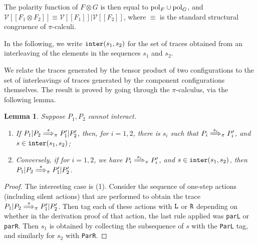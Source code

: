 \documentclass[11pt,a4paper]{amsart}
\theoremstyle{plain}
\theoremstyle{definition}
\theoremstyle{defC}
\theoremstyle{thmC}
\theoremstyle{plain}
\numberwithin{equation}{section}
\def\finish#1{\vskip.2cm\noindent{\em #1}%
  \marginpar{$\longleftarrow$}\vskip.2cm}
\newcommand{\finish}[1]{}
\newcommand{\trace}{s}
\newcommand{\appendCon}[2]{#1 \otimes #2}
\newcommand{\rmm}[1]{{\tt{\lowercase{#1}}}}
\newcommand{\genArr}[2]{\mathrel{\stackrel{{#1}}{\Longrightarrow}_{\rmm{\lowercase{#2}}}}}  %
\newcommand{\ArrPI}[1]{\genArr{#1}{\pi}}   %
\newcommand{\interl}[2]{{\tt inter}( #1, #2)}
\newcommand{\FF}{F}
\newcommand{\GG}{G}
\newcommand{\cbvSymb}{{\mathcal {V}}}
\newcommand{\encoEnvI}[1]{ \cbvSymb[\! [ #1 ] \! ]  } %
\newcommand{\encoConI}{\encoEnvI} %
\newcommand{\gj}[1]{\finish{{\bf GJ:} #1}}
\newcommand{\ds}[1]{\finish{{\bf DS:} #1}}
\newcommand{\gj}[1]{}
\newcommand{\ds}[1]{}
\newcommand{\Label}{{\rm pol}}
\theoremstyle{plain}
\newtheorem{lemma}[thm]{Lemma}
\theoremstyle{definition}
\begin{document}
\noindent
 The polarity function of $\appendCon \FF \GG$ 
 is then equal to $\Label_{\FF} \cup \Label_{\GG}$, and
$\encoConI {
\appendCon
{\FF_1} {\FF_2}}
\equiv 
\encoConI {
\FF_1}
|
\encoConI {
 {\FF_2}}$,  where $\equiv$ is the standard structural congruence of  $\pi$-calculi.
 

In the following, we write $\interl{\trace_1}{\trace_2}$ for the set of traces
obtained from an interleaving of the elements in the sequences $\trace_1$ and $\trace_2$.

We relate the traces generated by the tensor product 
of two configurations to the set of interleavings of traces generated 
by the component configurations themselves. 
The result is proved by going through the $\pi$-calculus,
via the following lemma.


\begin{lemma}
  \label{l:dec_pi}
  Suppose $P_1,P_2$ cannot interact.
  \begin{enumerate}
  \item
  If $P_1 | P_2 \ArrPI \trace   P_1'| P_2'$,
  then, for $i=1,2$,  there is  $ \trace_i $ 
  such that $P_i \ArrPI { \trace_i} P_i'$, and $ \trace  
  \in   \interl { \trace_1   }{ \trace_2 }$;
  \item 
  Conversely,
  if for  $i=1,2$,  we have $P_i \ArrPI { \trace_i} P_i'$, and $ \trace  
  \in   \interl { \trace_1   }{ \trace_2 }$, then 
  $P_1 | P_2 \ArrPI \trace   P_1'| P_2'$.
  \end{enumerate} 
\end{lemma} 


\begin{proof}
  The interesting case is (1). 
  Consider the sequence of one-step  actions (including silent actions) that 
  are performed to obtain the trace
  $P_1 | P_2 \ArrPI \trace   P_1'| P_2'$.  Then tag each of these actions with ${\tt L}$ or 
  ${\tt R}$ depending on whether in the derivation proof of that action, the last rule
  applied was {\tt parL} or  {\tt parR}.
  Then $ \trace_1$ is obtained by collecting the subsequence of $\trace$ with  
  the {\tt ParL} tag, and similarly for   $ \trace_2$ with
  {\tt ParR}.
\end{proof}
\end{document}
